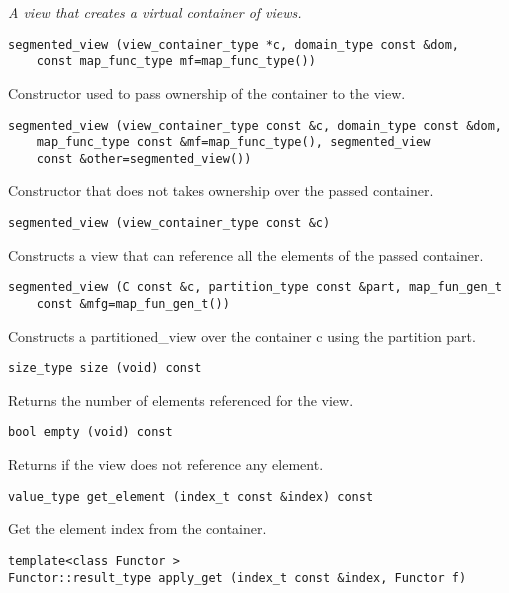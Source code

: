 \emph{ A view that creates a virtual container of views. }

\begin{verbatim}
segmented_view (view_container_type *c, domain_type const &dom,
    const map_func_type mf=map_func_type())
\end{verbatim}

Constructor used to pass ownership of the container to the view.

\begin{verbatim}
segmented_view (view_container_type const &c, domain_type const &dom,
    map_func_type const &mf=map_func_type(), segmented_view
    const &other=segmented_view())
\end{verbatim}

Constructor that does not takes ownership over the passed container.

\begin{verbatim}
segmented_view (view_container_type const &c)
\end{verbatim}

Constructs a view that can reference all the elements of the passed container.

\begin{verbatim}
segmented_view (C const &c, partition_type const &part, map_fun_gen_t
    const &mfg=map_fun_gen_t())
\end{verbatim}

Constructs a partitioned\_view over the container c using the partition part.

\begin{verbatim}
size_type size (void) const
\end{verbatim}

Returns the number of elements referenced for the view.

\begin{verbatim}
bool empty (void) const
\end{verbatim}

Returns if the view does not reference any element.

\begin{verbatim}
value_type get_element (index_t const &index) const
\end{verbatim}

Get the element index from the container.

\begin{verbatim}
template<class Functor >
Functor::result_type apply_get (index_t const &index, Functor f)
\end{verbatim}

